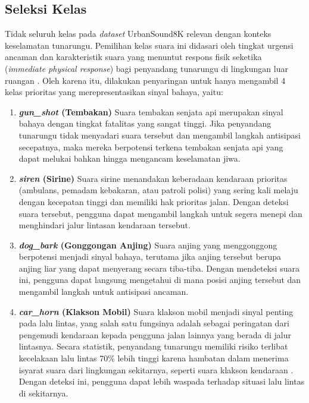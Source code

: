 \subsection{Seleksi Kelas}
Tidak seluruh kelas pada \textit{dataset} UrbanSound8K relevan dengan konteks keselamatan tunarungu.
Pemilihan kelas suara ini didasari oleh tingkat urgensi ancaman dan karakteristik suara yang menuntut respons fisik seketika (\textit{immediate physical response}) bagi penyandang tunarungu di lingkungan luar ruangan \cite{jain2020soundwatch}.
Oleh karena itu, dilakukan penyaringan untuk hanya mengambil 4 kelas prioritas yang merepresentasikan sinyal bahaya, yaitu:
\begin{enumerate}
    \item \textbf{\textit{gun\_shot} (Tembakan)} \newline
    Suara tembakan senjata api merupakan sinyal bahaya dengan tingkat fatalitas yang sangat tinggi. 
    Jika penyandang tunarungu tidak menyadari suara tersebut dan mengambil langkah antisipasi secepatnya, maka mereka berpotensi terkena tembakan senjata api yang dapat melukai bahkan hingga mengancam keselamatan jiwa.
    
    \item \textbf{\textit{siren} (Sirine)} \newline
    Suara sirine menandakan keberadaan kendaraan prioritas (ambulans, pemadam kebakaran, atau patroli polisi) yang sering kali melaju dengan kecepatan tinggi dan memiliki hak prioritas jalan. Dengan deteksi suara tersebut, pengguna dapat mengambil langkah untuk segera menepi dan menghindari jalur lintasan kendaraan tersebut.
    
    \item \textbf{\textit{dog\_bark} (Gonggongan Anjing)} \newline
    Suara anjing yang menggonggong berpotensi menjadi sinyal bahaya, terutama jika anjing tersebut berupa anjing liar yang dapat menyerang secara tiba-tiba. Dengan mendeteksi suara ini, pengguna dapat langsung mengetahui di mana posisi anjing tersebut dan mengambil langkah untuk antisipasi ancaman.
    
    \item \textbf{\textit{car\_horn} (Klakson Mobil)} \newline
    Suara klakson mobil menjadi sinyal penting pada lalu lintas, yang salah satu fungsinya adalah sebagai peringatan dari pengemudi kendaraan kepada pengguna jalan lainnya yang berada di jalur lintasnya.
    Secara statistik, penyandang tunarungu memiliki risiko terlibat kecelakaan lalu lintas 70\% lebih tinggi karena hambatan dalam menerima isyarat suara dari lingkungan sekitarnya, seperti suara klakson kendaraan \cite{junghee2014ads}.
    Dengan deteksi ini, pengguna dapat lebih waspada terhadap situasi lalu lintas di sekitarnya.
\end{enumerate}
\medskip


